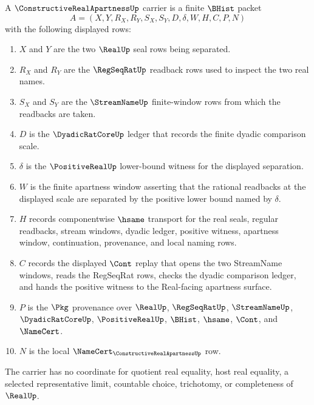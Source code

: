 \begin{definition}
\label{def:constructive-real-apartness-carrier}
A $\ConstructiveRealApartnessUp$ carrier is a finite $\BHist$ packet
$$
A=(X,Y,R_X,R_Y,S_X,S_Y,D,\delta,W,H,C,P,N)
$$
with the following displayed rows:
\begin{enumerate}
\item $X$ and $Y$ are the two $\RealUp$ seal rows being separated.
\item $R_X$ and $R_Y$ are the $\RegSeqRatUp$ readback rows used to inspect the two real names.
\item $S_X$ and $S_Y$ are the $\StreamNameUp$ finite-window rows from which the readbacks are taken.
\item $D$ is the $\DyadicRatCoreUp$ ledger that records the finite dyadic comparison scale.
\item $\delta$ is the $\PositiveRealUp$ lower-bound witness for the displayed separation.
\item $W$ is the finite apartness window asserting that the rational readbacks at the displayed scale are separated by the positive lower bound named by $\delta$.
\item $H$ records componentwise $\hsame$ transport for the real seals, regular readbacks, stream windows, dyadic ledger, positive witness, apartness window, continuation, provenance, and local naming rows.
\item $C$ records the displayed $\Cont$ replay that opens the two StreamName windows, reads the RegSeqRat rows, checks the dyadic comparison ledger, and hands the positive witness to the Real-facing apartness surface.
\item $P$ is the $\Pkg$ provenance over $\RealUp$, $\RegSeqRatUp$, $\StreamNameUp$, $\DyadicRatCoreUp$, $\PositiveRealUp$, $\BHist$, $\hsame$, $\Cont$, and $\NameCert$.
\item $N$ is the local $\NameCert_{\ConstructiveRealApartnessUp}$ row.
\end{enumerate}
The carrier has no coordinate for quotient real equality, host real equality, a selected representative limit, countable choice, trichotomy, or completeness of $\RealUp$.
\end{definition}

